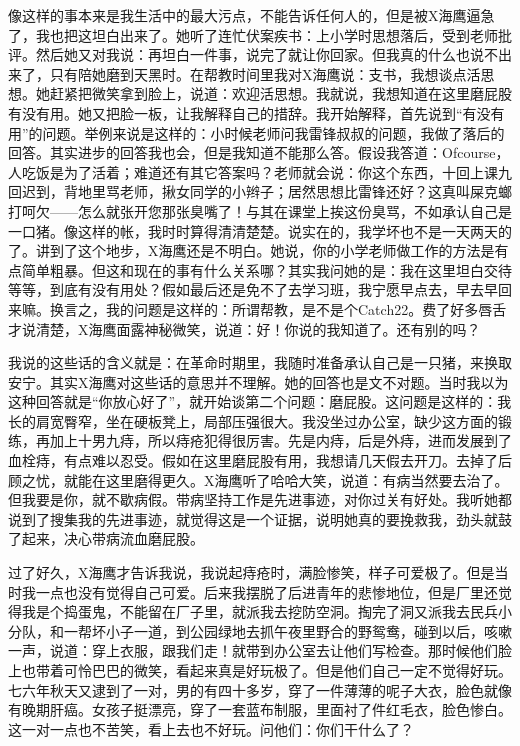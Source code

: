 像这样的事本来是我生活中的最大污点，不能告诉任何人的，但是被X海鹰逼急了，我也把这坦白出来了。她听了连忙伏案疾书：上小学时思想落后，受到老师批评。然后她又对我说：再坦白一件事，说完了就让你回家。但我真的什么也说不出来了，只有陪她磨到天黑时。在帮教时间里我对X海鹰说：支书，我想谈点活思想。她赶紧把微笑拿到脸上，说道：欢迎活思想。我就说，我想知道在这里磨屁股有没有用。她又把脸一板，让我解释自己的措辞。我开始解释，首先说到“有没有用”的问题。举例来说是这样的：小时候老师问我雷锋叔叔的问题，我做了落后的回答。其实进步的回答我也会，但是我知道不能那么答。假设我答道：Ofcourse，人吃饭是为了活着；难道还有其它答案吗？老师就会说：你这个东西，十回上课九回迟到，背地里骂老师，揪女同学的小辫子；居然思想比雷锋还好？这真叫屎克螂打呵欠——怎么就张开您那张臭嘴了！与其在课堂上挨这份臭骂，不如承认自己是一口猪。像这样的帐，我时时算得清清楚楚。说实在的，我学坏也不是一天两天的了。讲到了这个地步，X海鹰还是不明白。她说，你的小学老师做工作的方法是有点简单粗暴。但这和现在的事有什么关系哪？其实我问她的是：我在这里坦白交待等等，到底有没有用处？假如最后还是免不了去学习班，我宁愿早点去，早去早回来嘛。换言之，我的问题是这样的：所谓帮教，是不是个Catch22。费了好多唇舌才说清楚，X海鹰面露神秘微笑，说道：好！你说的我知道了。还有别的吗？ 

我说的这些话的含义就是：在革命时期里，我随时准备承认自己是一只猪，来换取安宁。其实X海鹰对这些话的意思并不理解。她的回答也是文不对题。当时我以为这种回答就是“你放心好了”，就开始谈第二个问题：磨屁股。这问题是这样的：我长的肩宽臀窄，坐在硬板凳上，局部压强很大。我没坐过办公室，缺少这方面的锻练，再加上十男九痔，所以痔疮犯得很厉害。先是内痔，后是外痔，进而发展到了血栓痔，有点难以忍受。假如在这里磨屁股有用，我想请几天假去开刀。去掉了后顾之忧，就能在这里磨得更久。X海鹰听了哈哈大笑，说道：有病当然要去治了。但我要是你，就不歇病假。带病坚持工作是先进事迹，对你过关有好处。我听她都说到了搜集我的先进事迹，就觉得这是一个证据，说明她真的要挽救我，劲头就鼓了起来，决心带病流血磨屁股。 

过了好久，X海鹰才告诉我说，我说起痔疮时，满脸惨笑，样子可爱极了。但是当时我一点也没有觉得自己可爱。后来我摆脱了后进青年的悲惨地位，但是厂里还觉得我是个捣蛋鬼，不能留在厂子里，就派我去挖防空洞。掏完了洞又派我去民兵小分队，和一帮坏小子一道，到公园绿地去抓午夜里野合的野鸳鸯，碰到以后，咳嗽一声，说道：穿上衣服，跟我们走！就带到办公室去让他们写检查。那时候他们脸上也带着可怜巴巴的微笑，看起来真是好玩极了。但是他们自己一定不觉得好玩。七六年秋天又逮到了一对，男的有四十多岁，穿了一件薄薄的呢子大衣，脸色就像有晚期肝癌。女孩子挺漂亮，穿了一套蓝布制服，里面衬了件红毛衣，脸色惨白。这一对一点也不苦笑，看上去也不好玩。问他们：你们干什么了？ 

